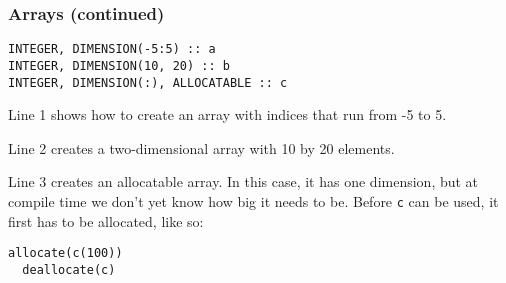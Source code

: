 \begin{frame}[fragile]
  \frametitle{Arrays (continued)}
  \begin{lstlisting}
INTEGER, DIMENSION(-5:5) :: a
INTEGER, DIMENSION(10, 20) :: b
INTEGER, DIMENSION(:), ALLOCATABLE :: c
  \end{lstlisting}

  Line 1 shows how to create an array with indices that run from -5 to 5.

  Line 2 creates a two-dimensional array with 10 by 20 elements.

  Line 3 creates an allocatable array. In this case, it has one dimension, 
  but at compile time we don't yet know how big it needs to be.
  Before \texttt{c} can be used, it first has to be allocated, like so:

  \begin{lstlisting}[numbers=none]
  allocate(c(100))
  deallocate(c)
  \end{lstlisting}

\end{frame}
